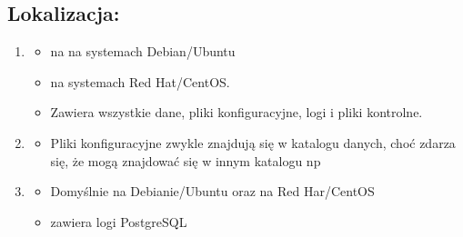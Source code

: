 \documentclass[letterpaper,10pt,polish]{sphinxmanual}
\begin{document}
\subsection{Lokalizacja:}
\label{\detokenize{Konfiguracja-bazy-danych:lokalizacja}}\begin{enumerate}
%
\item {} \begin{description}
\begin{itemize}
\item {} 
\sphinxAtStartPar
{} na na systemach Debian/Ubuntu

\item {} 
\sphinxAtStartPar
{} na systemach Red Hat/CentOS.

\item {} 
\sphinxAtStartPar
Zawiera wszystkie dane, pliki konfiguracyjne, logi i pliki kontrolne.

\end{itemize}

\end{description}

\item {} \begin{description}
\begin{itemize}
\item {} 
\sphinxAtStartPar
Pliki konfiguracyjne zwykle znajdują się w katalogu danych, choć zdarza się, że mogą znajdować się w innym katalogu np 

\end{itemize}

\end{description}

\item {} \begin{description}
\begin{itemize}
\item {} 
\sphinxAtStartPar
Domyślnie  na Debianie/Ubuntu oraz  na Red Har/CentOS

\item {} 
\sphinxAtStartPar
zawiera logi PostgreSQL

\end{itemize}

\end{description}

\end{enumerate}
\end{document}
